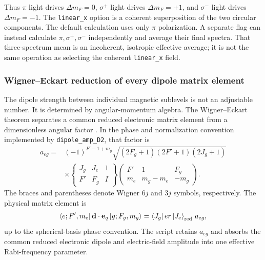 Thus \(\pi\) light drives \(\Delta m_F=0\), \(\sigma^+\) light drives
\(\Delta m_F=+1\), and \(\sigma^-\) light drives \(\Delta m_F=-1\).
The \texttt{linear\_x} option is a coherent superposition of the two circular
components.  The default calculation uses only \(\pi\) polarization.  A
separate flag can instead calculate \(\pi,\sigma^+,\sigma^-\) independently
and average their final spectra.  That three-spectrum mean is an incoherent,
isotropic effective average; it is not the same operation as selecting the
coherent \texttt{linear\_x} field.

\subsubsection{Wigner--Eckart reduction of every dipole matrix element}

The dipole strength between individual magnetic sublevels is not an adjustable
number.  It is determined by angular-momentum algebra.  The Wigner--Eckart
theorem separates a common reduced electronic matrix element from a
dimensionless angular factor \cite{Steck85,Steck87}.  In the phase and
normalization convention implemented by \texttt{dipole\_amp\_D2}, that factor
is
\begin{equation}
\begin{split}
a_{eg}
={}&
(-1)^{F'-1+m_g}
\sqrt{(2F_g+1)(2F'+1)(2J_g+1)}
\\
&\times
\begin{Bmatrix}
J_g & J_e & 1\\
F'  & F_g & I
\end{Bmatrix}
\begin{pmatrix}
F' & 1 & F_g\\
m_e & m_g-m_e & -m_g
\end{pmatrix}.
\end{split}
\label{eq:dipole_angular_factor}
\end{equation}
The braces and parentheses denote Wigner \(6j\) and \(3j\) symbols,
respectively.  The physical matrix element is
\begin{equation}
\left\langle e;F',m_e\right|\mathbf{d}\cdot\mathbf{e}_{q}\left|g;F_g,m_g\right\rangle
=
\left\langle J_g\right|er\left|J_e\right\rangle_{\mathrm{red}}\,a_{eg},
\end{equation}
up to the spherical-basis phase convention.  The script retains \(a_{eg}\)
and absorbs the common reduced electronic dipole and electric-field amplitude
into one effective Rabi-frequency parameter.

